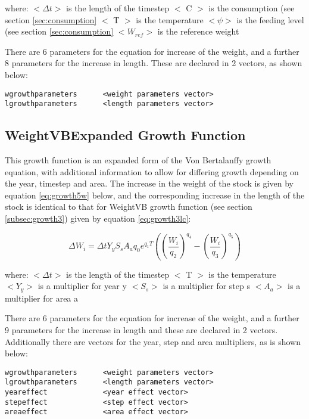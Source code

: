 \documentclass[]{book}
\begin{document}
where: \(<\Delta t>\) is the length of the timestep \(<\) C \(>\) is the
consumption (see section \ref{sec:consumption} \(<\) T \(>\) is the temperature \(<\psi>\) is
the feeding level (see
section \ref{sec:consumption} \(<W_{ref}>\) is the reference weight

There are 6 parameters for the equation for increase of the weight, and
a further 8 parameters for the increase in length. These are declared in
2 vectors, as shown below:

\begin{verbatim}
wgrowthparameters      <weight parameters vector>
lgrowthparameters      <length parameters vector>
\end{verbatim}

\hypertarget{subsec:growth5}{%
\subsection{WeightVBExpanded Growth Function}\label{subsec:growth5}}

This growth function is an expanded form of the Von Bertalanffy growth
equation, with additional information to allow for differing growth
depending on the year, timestep and area. The increase in the weight of
the stock is given by
equation \eqref{eq:growth5w} below, and the corresponding increase in the
length of the stock is identical to that for WeightVB growth function
(see section \ref{subsec:growth3}) given by
equation \eqref{eq:growth3lc}:

\begin{equation}
\label{eq:growth5w}
\Delta W_{i} = \Delta t Y_{y} S_{s} A_{a} q_{0} e^{q_{1}T} \left( \left( \frac{W_{i}}{q_{2}} \right)^{q_{4}} - \left( \frac{W_{i}}{q_{3}} \right)^{q_{5}} \right)
\end{equation}

where: \(<\Delta t>\) is the length of the timestep \(<\) T \(>\) is the
temperature \(<Y_{y}>\) is a multiplier for year y \(<S_{s}>\) is a
multiplier for step s \(<A_{a}>\) is a multiplier for area a

There are 6 parameters for the equation for increase of the weight, and
a further 9 parameters for the increase in length and these are declared
in 2 vectors. Additionally there are vectors for the year, step and area
multipliers, as is shown below:

\begin{verbatim}
wgrowthparameters      <weight parameters vector>
lgrowthparameters      <length parameters vector>
yeareffect             <year effect vector>
stepeffect             <step effect vector>
areaeffect             <area effect vector>
\end{verbatim}
\end{document}
